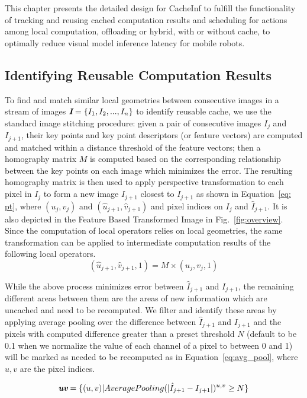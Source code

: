This chapter presents the detailed design for CacheInf to fulfill the functionality of tracking and reusing cached computation results and scheduling for actions among local computation, offloading or hybrid, with or without cache, to optimally reduce visual model inference latency for mobile robots.

\subsection{Identifying Reusable Computation Results\label{sec:reusable cache}}
To find and match similar local geometries between consecutive images in a stream of images $\textit{\textbf{I}}=\{I_1, I_2, ..., I_n\}$ to identify reusable cache, we use the standard image stitching procedure: given a pair of consecutive images $I_j$ and $I_{j+1}$, their key points and key point descriptors (or feature vectors) are computed and matched within a distance threshold of the feature vectors; then a homography matrix $M$ is computed based on the corresponding relationship between the key points on each image which minimizes the error.
The resulting homography matrix is then used to apply perspective transformation to each pixel in $I_j$ to form a new image $\hat{I}_{j+1}$ closest to $I_{j+1}$ as shown in Equation~\ref{eq: pt}, where $(u_j,v_j)$ and $(\hat{u}_{j+1},\hat{v}_{j+1})$ and pixel indices on $I_j$ and $\hat{I}_{j+1}$.
It is also depicted in the Feature Based Transformed Image in Fig.~\ref{fig:overview}.
Since the computation of local operators relies on local geometries, the same transformation can be applied to intermediate computation results of the following local operators.
\begin{equation}
    (\hat{u}_{j+1},\hat{v}_{j+1},1) = M \times (u_j,v_j,1)
    \label{eq: pt}
\end{equation}

While the above process minimizes error between $\hat{I}_{j+1}$ and $I_{j+1}$, the remaining different areas between them are the areas of new information which are uncached and need to be recomputed.
We filter and identify these areas by applying average pooling over the difference between $\hat{I}_{j+1}$ and $I_{j+1}$ and the pixels with computed difference greater than a preset threshold $N$ (default to be 0.1 when we normalize the value of each  channel of a pixel to between 0 and 1) will be marked as needed to be recomputed as in Equation~\ref{eq:avg_pool}, where $u,v$ are the pixel indices.

\begin{equation}
    \textit{\textbf{uv}} = \{(u,v)|AveragePooling(|\hat{I}_{j+1} - I_{j+1}|)^{u,v} \geq N\}
    \label{eq:avg_pool}
\end{equation}


